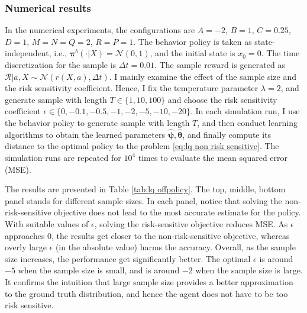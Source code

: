 \subsubsection{Numerical results}
In the numerical experiments, the configurations are $A = -2$, $B=1$, $C=0.25$, $D = 1$, $M=N=Q=2$, $R=P=1$. The behavior policy is taken as state-independent, i.e., $\bm\pi^b(\cdot|X) = \mathcal{N}(0,1)$, and the initial state is $x_0=0$. The time discretization for the sample is $\Delta t=0.01$. The sample reward is generated as $\mathcal R | a, X \sim \mathcal N\left( r(X,a), \Delta t \right)$. I mainly examine the effect of the sample size and the risk sensitivity coefficient. Hence, I fix the temperature parameter $\lambda=2$, and generate sample with length $T\in \{1,10,100\}$ and choose the risk sensitivity coefficient $\epsilon\in \{0,-0.1,-0.5,-1,-2,-5,-10,-20\}$. In each simulation run, I use the behavior policy to generate sample with length $T$, and then conduct learning algorithms to obtain the learned parameters $\hat{\bm\psi},\hat{\bm{\theta}}$, and finally compute its distance to the optimal policy to the problem \eqref{eq:lq non risk sensitive}. The simulation runs are repeated for $10^4$ times to evaluate the mean squared error (MSE). 

The results are presented in Table \ref{tab:lq offpolicy}. The top, middle, bottom panel stands for different sample sizes. In each panel, notice that solving the non-risk-sensitive objective does not lead to the most accurate estimate for the policy. With suitable values of $\epsilon$, solving the risk-sensitive objective reduces MSE. As $\epsilon$ approaches 0, the results get closer to the non-risk-sensitive objective, whereas overly large $\epsilon$ (in the absolute value) harms the accuracy. Overall, as the sample size increases, the performance get significantly better. The optimal $\epsilon$ is around $-5$ when the sample size is small, and is around $-2$ when the sample size is large. It confirms the intuition that large sample size provides a better approximation to the ground truth distribution, and hence the agent does not have to be too risk sensitive. 


